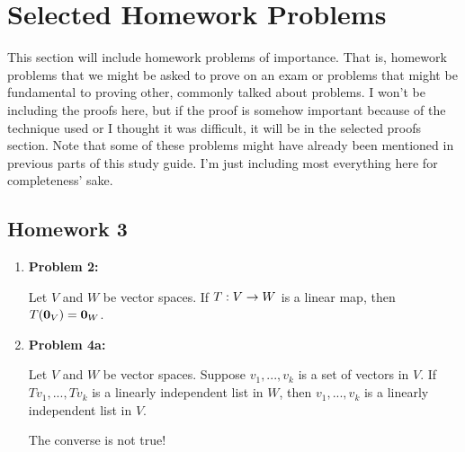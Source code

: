\section{Selected Homework Problems}
This section will include homework problems of importance. That is, homework problems that we might be asked to prove on an exam or problems that might
be fundamental to proving other, commonly talked about problems. I won't be including the proofs here, but if the proof is somehow important because of
the technique used or I thought it was difficult, it will be in the selected proofs section. Note that some of these problems might have already been
mentioned in previous parts of this study guide. I'm just including most everything here for completeness' sake.

\subsection{Homework 3}
\begin{enumerate}
    \item[] \textbf{Problem 2:} 
        \begin{lemma}
        Let $V$ and $W$ be vector spaces. If $T : V \rightarrow W$ is a linear map, then $T(\mathbf{0}_V) = \mathbf{0}_W$.
        \end{lemma}
    \item[] \textbf{Problem 4a:}
        \begin{lemma}
            Let $V$ and $W$ be vector spaces. Suppose $v_1, ..., v_k$ is a set of vectors in $V$. If $Tv_1, ..., Tv_k$ is a linearly independent list in
            $W$, then $v_1, ..., v_k$ is a linearly independent list in $V$.
        \end{lemma}
        \begin{remark}
            The converse is not true!
        \end{remark}
\end{enumerate}


